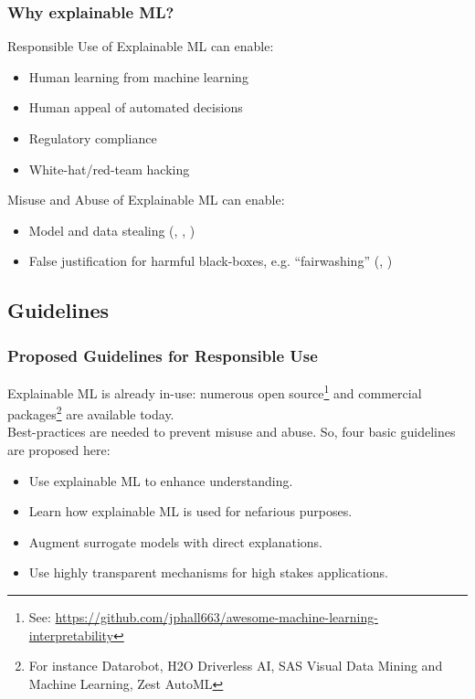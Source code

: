 \documentclass[11pt,
               aspectratio=169,
               hyperref={colorlinks}
               ]{beamer}
\begin{document}

	\begin{frame}
	
		\frametitle{Why explainable ML?}
		\vspace{10pt}
		Responsible Use of Explainable ML can enable:
		\begin{itemize}\footnotesize
			\item Human learning from machine learning
			\item Human appeal of automated decisions
			\item Regulatory compliance
			\item White-hat/red-team hacking
		\end{itemize}
		\vspace{5pt}
		Misuse and Abuse of Explainable ML can enable:
		\begin{itemize}\footnotesize
			\item Model and data stealing (\citet{model_stealing}, \citet{membership_inference}, \citet{shokri2019privacy})
			\item False justification for harmful black-boxes, e.g. ``fairwashing'' (\citet{fair_washing}, \citet{please_stop})
		\end{itemize}
		\normalsize
		
	\end{frame}
	
	\subsection{Guidelines}

	\begin{frame}
	
		\frametitle{Proposed Guidelines for Responsible Use}
		
		Explainable ML is already in-use: numerous open source\footnote{\tiny{See: \url{https://github.com/jphall663/awesome-machine-learning-interpretability}}} and commercial packages\footnote{\tiny{For instance  Datarobot, H2O Driverless AI, SAS Visual Data Mining and Machine Learning, Zest AutoML}} are available today.\\
		\vspace{5pt}
		Best-practices are needed to prevent misuse and abuse. So, four basic guidelines are proposed here:
		\vspace{5pt}
		\begin{itemize}
			\item Use explainable ML to enhance understanding.
			\item Learn how explainable ML is used for nefarious purposes.
			\item Augment surrogate models with direct explanations.
			\item Use highly transparent mechanisms for high stakes applications.
		\end{itemize}
		
	\end{frame}
\end{document}
